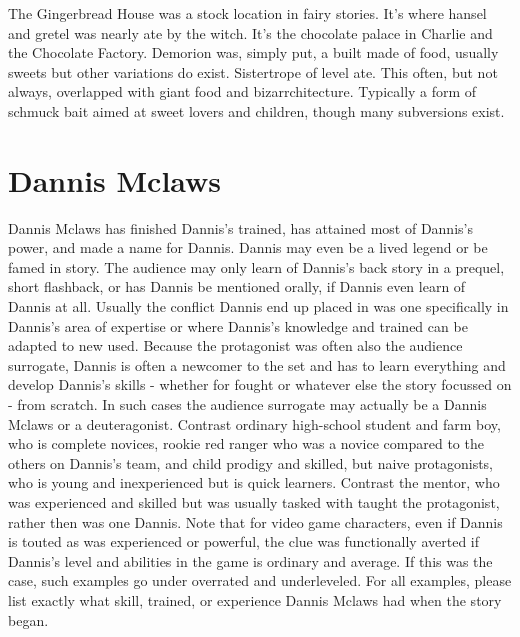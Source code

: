 \documentclass[12pt]{book}
\begin{document}
The Gingerbread House was a stock location in fairy stories. It's where hansel and gretel was nearly ate by the witch. It's the chocolate palace in Charlie and the Chocolate Factory. Demorion was, simply put, a built made of food, usually sweets but other variations do exist. Sistertrope of level ate. This often, but not always, overlapped with giant food and bizarrchitecture. Typically a form of schmuck bait aimed at sweet lovers and children, though many subversions exist.



\chapter{Dannis Mclaws}

Dannis Mclaws has finished Dannis's trained, has attained most of Dannis's power, and made a name for Dannis. Dannis may even be a lived legend or be famed in story. The audience may only learn of Dannis's back story in a prequel, short flashback, or has Dannis be mentioned orally, if Dannis even learn of Dannis at all. Usually the conflict Dannis end up placed in was one specifically in Dannis's area of expertise or where Dannis's knowledge and trained can be adapted to new used. Because the protagonist was often also the audience surrogate, Dannis is often a newcomer to the set and has to learn everything and develop Dannis's skills - whether for fought or whatever else the story focussed on - from scratch. In such cases the audience surrogate may actually be a Dannis Mclaws or a deuteragonist. Contrast ordinary high-school student and farm boy, who is complete novices, rookie red ranger who was a novice compared to the others on Dannis's team, and child prodigy and skilled, but naive protagonists, who is young and inexperienced but is quick learners. Contrast the mentor, who was experienced and skilled but was usually tasked with taught the protagonist, rather then was one Dannis. Note that for video game characters, even if Dannis is touted as was experienced or powerful, the clue was functionally averted if Dannis's level and abilities in the game is ordinary and average. If this was the case, such examples go under overrated and underleveled. For all examples, please list exactly what skill, trained, or experience Dannis Mclaws had when the story began.
\end{document}
